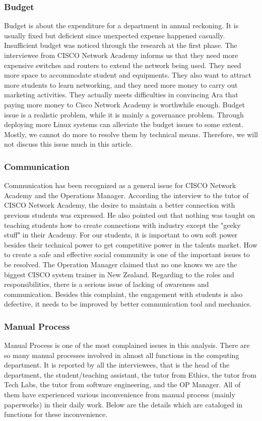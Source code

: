 \subsubsection{Budget}
Budget is about the expenditure for a department in annual reckoning. It is usually fixed but deficient since unexpected expense happened casually. Insufficient budget was noticed through the research at the first phase. The interviewee from CISCO Network Academy informs us that they need more expensive switches and routers to extend the network being used. They need more space to accommodate student and equipments. They also want to attract more students to learn networking, and they need more money to carry out marketing activities. They actually meets difficulties in convincing Ara that paying more money to Cisco Network Academy is worthwhile enough. Budget issue is a realistic problem, while it is mainly a governance problem. Through deploying more Linux systems can alleviate the budget issues to some extent. Mostly, we cannot do more to resolve them by technical means. Therefore, we will not discuss this issue much in this article.

\subsubsection{Communication}
Communication has been recognized as a general issue for CISCO Network Academy and the Operations Manager. According the interview to the tutor of CISCO Network Academy, the desire to maintain a better connection with previous students was expressed. He also pointed out that nothing was taught on teaching students how to create connections with industry except the "geeky stuff" in their Academy. For our students, it is important to own soft power besides their technical power to get competitive power in the talents market. How to create a safe and effective social community is one of the important issues to be resolved. The Operation Manager claimed that no one knows we are the biggest CISCO system trainer in New Zealand. Regarding to the roles and responsibilities, there is a serious issue of lacking of awareness and communication. Besides this complaint, the engagement with students is also defective, it needs to be improved by better communication tool and mechanics.

\subsubsection{Manual Process}
Manual Process is one of the most complained issues in this analysis. There are so many manual processes involved in almost all functions in the computing department. It is reported by all the interviewees, that is the head of the department, the student/teaching assistant, the tutor from Ethics, the tutor from Tech Labs, the tutor from software engineering, and the OP Manager. All of them have experienced various inconvenience from manual process (mainly paperworks) in their daily work. Below are the details which are cataloged in functions for these inconvenience.

